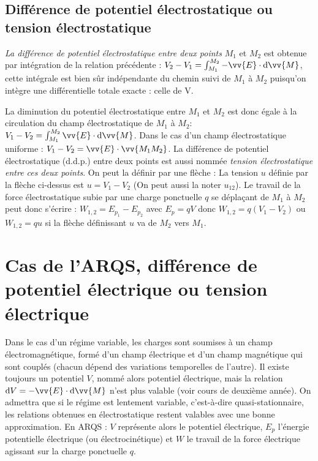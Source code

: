 \subsection{Différence de potentiel électrostatique ou tension 
électrostatique}%
\label{chap9-subsec:differencedepotentielelectrostatique}%

\emph{La différence de potentiel électrostatique entre deux points} \(M_1\) et 
\(M_2\) est obtenue par intégration de la relation précédente : \(V_2 - V_1 = 
\int_{M_1}^{M_2} -\vv{E} \cdot \D \vv{M}\), cette intégrale est bien sûr 
indépendante du chemin suivi de \(M_1\) à \(M_2\) puisqu'on intègre une 
différentielle totale exacte : celle de V.%

La diminution du potentiel électrostatique entre \(M_1\) et \(M_2\) est donc 
égale à la circulation du champ électrostatique de \(M_1\) à \(M_2\): \(V_1-V_2 
= \int_{M_1}^{M_2} \vv{E} \cdot \D \vv{M}\).
Dans le cas d'un champ électrostatique uniforme : \(V_1-V_2 = \vv{E} \cdot 
\vv{M_1M_2}\).
La différence de potentiel électrostatique (d.d.p.) entre deux points est aussi 
nommée \emph{tension électrostatique entre ces deux points}. On peut la définir 
par une flèche :
La tension \(u\) définie par la flèche ci-dessus est \(u=V_1-V_2\) (On peut 
aussi la noter \(u_{12}\)). Le travail de la force électrostatique subie par 
une charge ponctuelle \(q\) se déplaçant de \(M_1\) à \(M_2\) peut donc 
s'écrire : \(W_{1,2} = E_{p_1} - E_{p_2}\) avec \(E_p = q V\) donc \(W_{1,2} = 
q(V_1-V_2)\) ou \(W_{1,2} = q u\) si la flèche définissant \(u\) va de \(M_2\) 
vers \(M_1\).

\section{Cas de l'ARQS, différence de potentiel électrique ou tension 
électrique}%
\label{chap9-sec:casdelARQS}%

Dans le cas d'un régime variable, les charges sont soumises à un champ 
électromagnétique, formé d'un champ électrique et d'un champ magnétique qui 
sont couplés (chacun dépend des variations temporelles de l'autre). Il existe 
toujours un potentiel \(V\), nommé alors potentiel électrique, mais la relation 
\(\D V = -\vv{E} \cdot \D \vv{M}\) n'est plus valable (voir cours de deuxième 
année).
On admettra que si le régime est lentement variable, c'est-à-dire 
quasi-stationnaire, les relations obtenues en électrostatique restent valables 
avec une bonne approximation.
En ARQS : \(V\) représente alors le potentiel électrique, \(E_p\) l'énergie 
potentielle électrique (ou électrocinétique) et \(W\) le travail de la force 
électrique agissant sur la charge ponctuelle \(q\).

